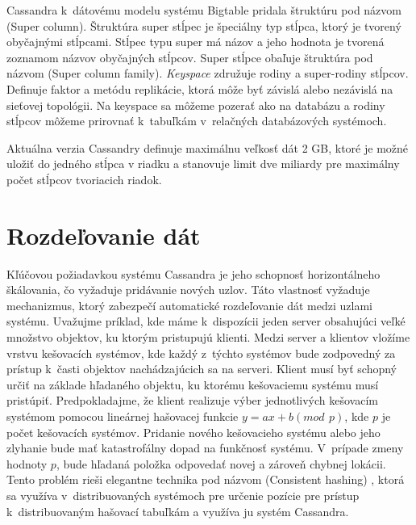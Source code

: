 \documentclass[11pt,twoside,a4paper]{book}
\begin{document}
Cassandra k~dátovému modelu systému Bigtable pridala štruktúru pod názvom \emph{} (Super column). Štruktúra super stĺpec je špeciálny typ stĺpca, ktorý je tvorený obyčajnými stĺpcami. Stĺpec typu super má názov a jeho hodnota je tvorená zoznamom názvov obyčajných stĺpcov. Super stĺpce obaľuje štruktúra pod názvom \emph{} (Super column family). \emph{Keyspace} združuje rodiny a super-rodiny stĺpcov. Definuje faktor a metódu replikácie, ktorá môže byť závislá alebo nezávislá na sieťovej topológii. Na keyspace sa môžeme pozerať ako na databázu a rodiny stĺpcov môžeme prirovnať k~tabuľkám v~relačných databázových systémoch.

Aktuálna verzia Cassandry definuje maximálnu veľkosť dát 2 GB, ktoré je možné uložiť do jedného stĺpca v riadku a stanovuje limit dve miliardy pre maximálny počet stĺpcov tvoriacich riadok.



\section{Rozdeľovanie dát}
Kľúčovou požiadavkou systému Cassandra je jeho schopnosť horizontálneho škálovania, čo vyžaduje pridávanie nových uzlov. Táto vlastnosť vyžaduje mechanizmus, ktorý zabezpečí automatické rozdeľovanie dát medzi uzlami systému. Uvažujme príklad, kde máme k~dispozícii jeden server obsahujúci veľké množstvo objektov, ku ktorým pristupujú klienti. Medzi server a klientov vložíme vrstvu kešovacích systémov, kde každý z~týchto systémov bude zodpovedný za prístup k~časti objektov nachádzajúcich sa na serveri. Klient musí byť schopný určiť na základe hľadaného objektu, ku ktorému kešovaciemu systému musí pristúpiť. Predpokladajme, že klient realizuje výber jednotlivých kešovacím systémom pomocou lineárnej hašovacej funkcie ${y = ax + b (mod\,\ p)}$, kde $p$ je počet kešovacích systémov. Pridanie nového kešovacieho systému alebo jeho zlyhanie bude mať katastrofálny dopad na funkčnosť systému. V~prípade zmeny hodnoty $p$, bude hľadaná položka odpovedať novej a zároveň chybnej lokácii. Tento problém rieši elegantne technika pod názvom \emph{} (Consistent hashing) \cite{Karger:1997:CHR:258533.258660}, ktorá sa využíva v~distribuovaných systémoch pre určenie pozície pre prístup k~distribuovaným hašovací tabuľkám a využíva ju systém Cassandra.
\end{document}
